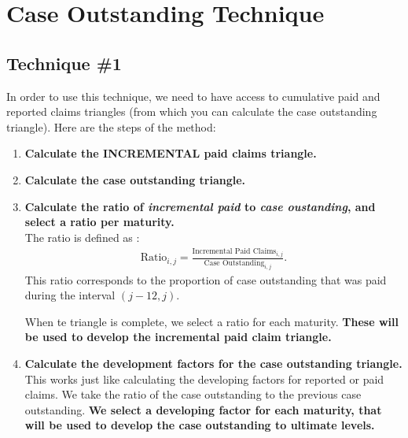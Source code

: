 \documentclass[11pt, english]{memoir}
\numberwithin{definition}{section}
\begin{document}
	
	





\chapter{Case Outstanding Technique}

\section{Technique \#1}
	In order to use this technique, we need to have access to cumulative paid and reported claims triangles (from which you can calculate the case outstanding triangle). Here are the steps of the method: 
	\begin{enumerate}
		\item \textbf{Calculate the INCREMENTAL paid claims triangle.}\\
		
		\item \textbf{Calculate the case outstanding triangle.}\\
		
		\item \textbf{Calculate the ratio of \emph{incremental paid} to \emph{case oustanding}, and select a ratio per maturity.}\\
		The ratio is defined as :
		\begin{align*}
		\text{Ratio}_{i,j} = \frac{\text{Incremental Paid Claims}_{i,j}}{\text{Case Outstanding}_{i,j}}.
		\end{align*}
		This ratio corresponds to the proportion of case outstanding that was paid during the interval $ (j-12, j) $.
		
		When te triangle is complete, we select a ratio for each maturity. \textbf{These will be used to develop the incremental paid claim triangle. }\\
		
		
		\item \textbf{Calculate the development factors for the case outstanding triangle.}\\
		This works just like calculating the developing factors for reported or paid claims. We take the ratio of the case outstanding to the previous case outstanding. \textbf{We select a developing factor for each maturity, that will be used to develop the case outstanding to ultimate levels.} \\
		
		
		

\end{enumerate}
\end{document}
